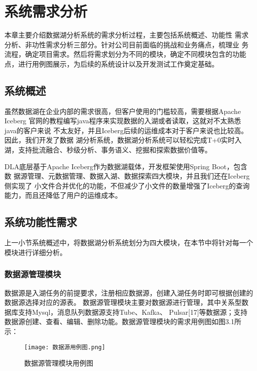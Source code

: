 
\chapter{系统需求分析}

本章主要介绍数据湖分析系统的需求分析过程，主要包括系统概述、功能性
需求分析、非功性需求分析三部分。针对公司目前面临的挑战和业务痛点，梳理业
务流程，确定项目需求。然后将需求划分为不同的模块，确定不同模块包含的功能
点，进行用例图展示，为后续的系统设计以及开发测试工作奠定基础。

\section{系统概述}

虽然数据湖在企业内部的需求很高，但客户使用的门槛较高，需要根据Apache Iceberg
官网的教程编写java程序来实现数据的入湖或者读取，这就对不太熟悉java的客户来说
不太友好，并且Iceberg后续的运维成本对于客户来说也比较高。因此，我们开发了数据
湖分析系统，数据湖分析系统可以轻松完成T+0实时入湖，支持批流融合、秒级分析、事务语义、挖掘和探索数据价值等。

DLA底层基于Apache Iceberg作为数据湖载体，开发框架使用Spring Boot，包含数
据源管理、元数据管理、数据入湖、数据探索四大模块，并且我们还在Iceberg侧实现了
小文件合并优化的功能，不但减少了小文件的数量增强了Iceberg的查询能力，而且还降低了用户的运维成本。

\section{系统功能性需求}

上一小节系统概述中，将数据湖分析系统划分为四大模块，在本节中将针对每一个模块进行详细分析。

\subsection{数据源管理模块}

数据源是入湖任务的前提要求，注册相应数据源，创建入湖任务时即可根据创建的数据源选择对应的源表。
数据源管理模块主要对数据源进行管理，其中关系型数据库支持Mysql，消息队列数据源支持Tube、Kafka、
Pulsar[17]等数据源；支持数据源创建、查看、编辑、删除功能。数据源管理模块的需求用例图如图3.1所示：

\begin{figure}[h]
  \centering
  \texttt{[image: 数据源用例图.png]}
  \caption{数据源管理模块用例图}
  \label{fig:badge}
\end{figure}

